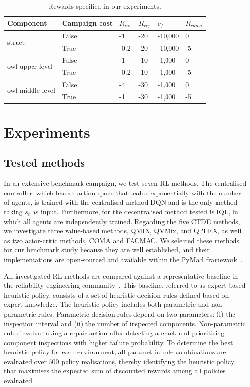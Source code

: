 \begin{table}
\centering
\begin{tabular}{llllll}
\toprule
Component & Campaign cost & $R_{ins}$ & $R_{rep}$ &  $c_f$ & $R_{camp}$ \\
\bottomrule
\multirow{2}{*}{struct} &  False & -1 & -20 & -10,000 & 0  \\ 
& True & -0.2 & -20 & -10,000 & -5   \\
\bottomrule
\multirow{2}{*}{owf upper level} & False & -1 & -10 & -1,000 & 0     \\
& True  & -0.2 & -10 & -1,000 & -5     \\
\multirow{2}{*}{owf middle level} & False & -4 & -30 & -1,000 & 0    \\
& True & -1 & -30 & -1,000 & -5    \\
\bottomrule
\end{tabular}
\caption{Rewards specified in our experiments.}
\label{tab:rewards_det}
\end{table}


\section{Experiments}\label{sec:ch5_experiments}
\subsection{Tested methods}
\label{sec:tested_method}
In an extensive benchmark campaign, we test seven RL methods.
The centralised controller, which has an action space that scales exponentially with the number of agents, is trained with the centralised method DQN and is the only method taking $s_t$ as input.
Furthermore, for the decentralised method tested is IQL, in which all agents are independently trained.
Regarding the five CTDE methods, we investigate three value-based methods, QMIX, QVMix, and QPLEX, as well as two actor-critic methods, COMA and FACMAC.
We selected these methods for our benchmark study because they are well established, and their implementations are open-sourced and available within the PyMarl framework~\citep{samvelyan2019starcraft}.

All investigated RL methods are compared against a representative baseline in the reliability engineering community~\citep{LuqueDBN2019,morato2022syst}.
This baseline, referred to as expert-based heuristic policy, consists of a set of heuristic decision rules defined based on expert knowledge.
The heuristic policy includes both parametric and non-parametric rules.
Parametric decision rules depend on two parameters: (i) the inspection interval and (ii) the number of inspected components.
Non-parametric rules involve taking a repair action after detecting a crack and prioritising component inspections with higher failure probability.
To determine the best heuristic policy for each environment, all parametric rule combinations are evaluated over 500 policy realisations, thereby identifying the heuristic policy that maximises the expected sum of discounted rewards among all policies evaluated.

